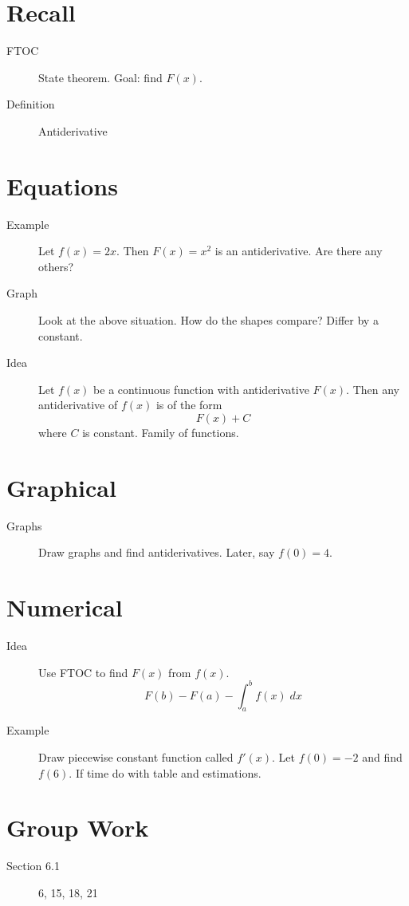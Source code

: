 \documentclass[11pt]{article}
\begin{document}
\drawtitle

\section*{Recall}
\begin{description}
\item[FTOC] State theorem.  Goal: find $F(x)$.
\item[Definition] Antiderivative
\end{description}

\section*{Equations}
\begin{description}
\item[Example] Let $f(x)=2x$.  Then $F(x)=x^2$ is an antiderivative.
  Are there any others?
\item[Graph] Look at the above situation.  How do the shapes compare?
  Differ by a constant.
\item[Idea] Let $f(x)$ be a continuous function with antiderivative
  $F(x)$.  Then any antiderivative of $f(x)$ is of the form
  \[
  F(x)+C
  \]
  where $C$ is constant.  Family of functions.
\end{description}

\section*{Graphical}
\begin{description}
\item[Graphs] Draw graphs and find antiderivatives.  Later, say $f(0)=4$.
\end{description}

\section*{Numerical}
\begin{description}
\item[Idea] Use FTOC to find $F(x)$ from $f(x)$.
  \[
  F(b)-F(a)-\int_a^b f(x)\;dx
  \]
\item[Example] Draw piecewise constant function called $f'(x)$.  Let
  $f(0)=-2$ and find $f(6)$.  If time do with table and estimations.
\end{description}

\section*{Group Work}
\begin{description}
\item[Section 6.1] 6, 15, 18, 21
\end{description}
\end{document}
